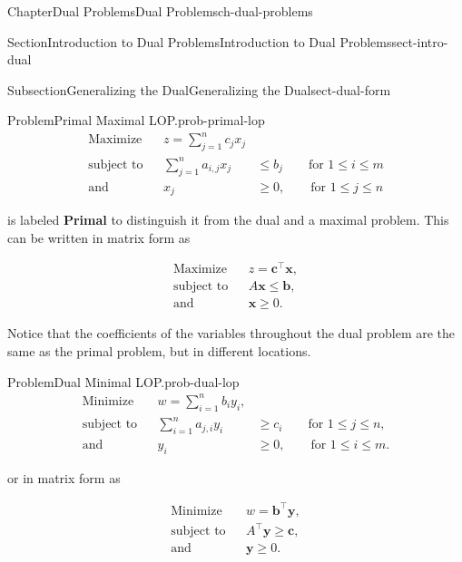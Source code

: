 \documentclass[oneside,10pt,]{book}
\newcommand{\terminology}[1]{\textbf{#1}}
\numberwithin{equation}{section}
\newcommand{\amp}{&}
\begin{document}
\begin{chapterptx}{Chapter}{Dual Problems}{}{Dual Problems}{}{}{ch-dual-problems}
\begin{sectionptx}{Section}{Introduction to Dual Problems}{}{Introduction to Dual Problems}{}{}{sect-intro-dual}
\begin{subsectionptx}{Subsection}{Generalizing the Dual}{}{Generalizing the Dual}{}{}{sect-dual-form}
\begin{problem}{Problem}{Primal Maximal LOP.}{prob-primal-lop}%
%
\begin{equation*}
\begin{aligned} \text{Maximize} \amp \amp z =  \sum_{j=1}^n c_j x_j \amp \\ \text{subject to} \amp \amp \sum_{j=1}^n a_{i,j} x_j \amp \leq b_j \qquad \text{for $1 \leq i \leq m$} \\ \text{and} \amp \amp x_j \amp \geq 0, \qquad \text{for $1 \leq j \leq n$} \end{aligned}
\end{equation*}
%
\end{problem}
is labeled \terminology{Primal} to distinguish it from the dual and a maximal problem. This can be written in matrix form as%
\par
%
\begin{equation}
\begin{aligned} \text{Maximize} \amp \amp z =  \boldsymbol{c}^{\intercal} \boldsymbol{x}, \\ \text{subject to} \amp \amp A \boldsymbol{x} \leq \boldsymbol{b}, \\ \text{and} \amp \amp \boldsymbol{x} \geq 0.
\end{aligned}\label{eq-primal-matrix}
\end{equation}
%
\par
Notice that the coefficients of the variables throughout the dual problem are the same as the primal problem, but in different locations.%
\begin{problem}{Problem}{Dual Minimal LOP.}{prob-dual-lop}%
%
\begin{equation*}
\begin{aligned} \text{Minimize} \amp \amp w =  \sum_{i=1}^n b_i y_i, \amp \\ \text{subject to} \amp \amp \sum_{i=1}^n a_{j,i} y_i \amp \geq c_i \qquad \text{for $1 \leq j \leq n$,} \\ \text{and} \amp \amp y_i \amp \geq 0, \qquad \text{for $1 \leq i \leq m$.} \end{aligned}
\end{equation*}
%
\end{problem}
or in matrix form as%
\par
%
\begin{equation}
\begin{aligned} \text{Minimize} \amp \amp w =  \boldsymbol{b}^{\intercal} \boldsymbol{y}, \\ \text{subject to} \amp \amp A^{\intercal} \boldsymbol{y} \geq \boldsymbol{c}, \\ \text{and} \amp \amp \boldsymbol{y} \geq 0.

\end{aligned}
\end{equation}
\end{subsectionptx}
\end{sectionptx}
\end{chapterptx}
\end{document}
